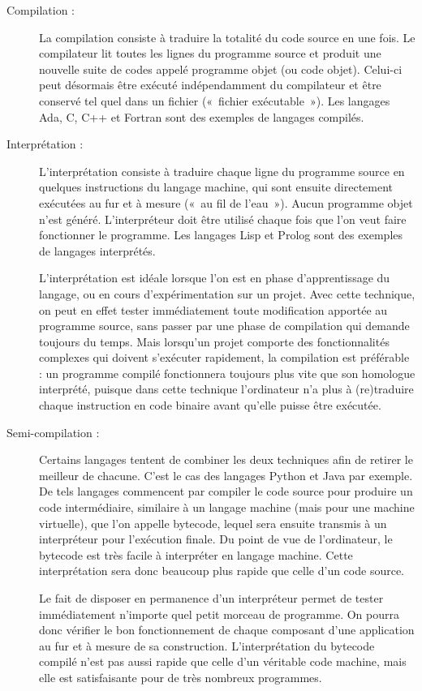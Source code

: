 \begin{description}
\item[Compilation :] La compilation consiste à traduire la totalité du code source en une fois. 
Le compilateur lit toutes les lignes du programme source et produit une nouvelle 
suite de codes appelé programme objet (ou code objet). 
Celui-ci peut désormais être exécuté indépendamment du
compilateur et être conservé tel quel dans un fichier («~fichier exécu\-table~»).
Les langages {\sc Ada}, {\sc C}, {\sc C++} et {\sc Fortran} sont des exemples de langages 
compilés.

\item[Interprétation :] L'interprétation consiste à traduire chaque ligne du programme source en quelques instructions
du langage machine, qui sont ensuite directement exécutées au fur et à mesure
(«~au fil de l'eau~»). Aucun programme objet n'est généré.
L'interpréteur doit être utilisé chaque fois que l'on veut faire fonctionner le programme. 
Les langages {\sc Lisp} et {\sc Prolog} sont des exemples de langages interprétés.

L'interprétation est idéale lorsque l'on est en phase d'apprentissage du langage, ou en cours
d'expérimentation sur un projet. Avec cette technique, on peut en effet tester immédiatement toute
modification apportée au programme source, sans passer par une phase de compilation qui demande
toujours du temps.
Mais lorsqu'un projet comporte des fonctionnalités complexes qui doivent s'exécuter
rapidement, la compilation est préférable : un programme compilé fonctionnera
toujours plus vite que son homologue interprété, puisque dans cette technique l'ordinateur
n'a plus à (re)traduire chaque instruction en code binaire avant qu'elle puisse être exécutée.

\item[Semi-compilation :] Certains langages tentent de combiner les deux techniques afin de retirer le meilleur de
chacune. C'est le cas des langages {\sc Python} et {\sc Java} par exemple. 
De tels langages
commencent par compiler le code source pour produire un code intermédiaire, similaire à un langage
machine (mais pour une machine virtuelle), que l'on appelle bytecode, lequel sera ensuite transmis 
à un interpréteur pour l'exécution
finale. Du point de vue de l'ordinateur, le bytecode est très facile à interpréter en langage machine.
Cette interprétation sera donc beaucoup plus rapide que celle d'un code source.

Le fait de disposer en permanence d'un interpréteur permet de tester immédiatement n'importe
quel petit morceau de programme. On pourra donc vérifier le bon fonctionnement de chaque
composant d'une application au fur et à mesure de sa construction.
L'interprétation du bytecode compilé n'est pas aussi rapide que celle d'un véritable code machine,
mais elle est satisfaisante pour de très nombreux programmes.
\end{description}

